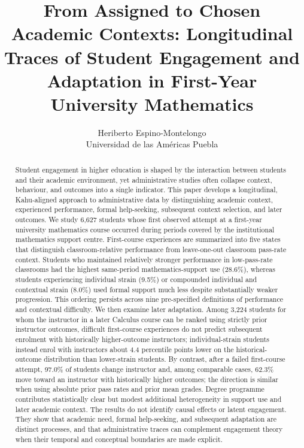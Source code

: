 \documentclass[11pt,a4paper]{article}
\title{From Assigned to Chosen Academic Contexts: Longitudinal Traces of Student Engagement and Adaptation in First-Year University Mathematics}
\author{Heriberto Espino-Montelongo\\Universidad de las Am\'ericas Puebla}
\date{}
\begin{document}
\maketitle

\begin{abstract}
Student engagement in higher education is shaped by the interaction between students and their academic environment, yet administrative studies often collapse context, behaviour, and outcomes into a single indicator. This paper develops a longitudinal, Kahu-aligned approach to administrative data by distinguishing academic context, experienced performance, formal help-seeking, subsequent context selection, and later outcomes. We study 6,627 students whose first observed attempt at a first-year university mathematics course occurred during periods covered by the institutional mathematics support centre. First-course experiences are summarized into five states that distinguish classroom-relative performance from leave-one-out classroom pass-rate context. Students who maintained relatively stronger performance in low-pass-rate classrooms had the highest same-period mathematics-support use (28.6\%), whereas students experiencing individual strain (9.5\%) or compounded individual and contextual strain (8.0\%) used formal support much less despite substantially weaker progression. This ordering persists across nine pre-specified definitions of performance and contextual difficulty. We then examine later adaptation. Among 3,224 students for whom the instructor in a later Calculus course can be ranked using strictly prior instructor outcomes, difficult first-course experiences do not predict subsequent enrolment with historically higher-outcome instructors; individual-strain students instead enrol with instructors about 4.4 percentile points lower on the historical-outcome distribution than lower-strain students. By contrast, after a failed first-course attempt, 97.0\% of students change instructor and, among comparable cases, 62.3\% move toward an instructor with historically higher outcomes; the direction is similar when using absolute prior pass rates and prior mean grades. Degree programme contributes statistically clear but modest additional heterogeneity in support use and later academic context. The results do not identify causal effects or latent engagement. They show that academic need, formal help-seeking, and subsequent adaptation are distinct processes, and that administrative traces can complement engagement theory when their temporal and conceptual boundaries are made explicit.
\end{abstract}
\end{document}
